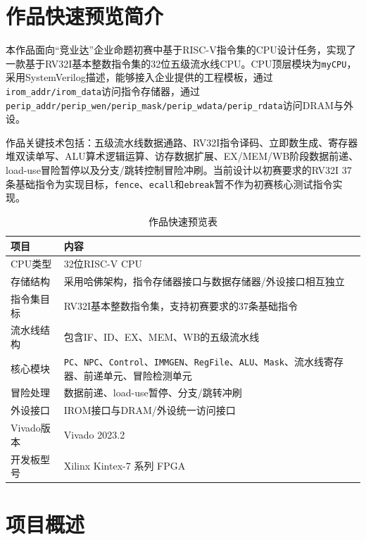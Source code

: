 \documentclass[UTF8,a4paper,12pt]{ctexart}
\newcommand{\code}[1]{\texttt{#1}}
\begin{document}
\section*{作品快速预览简介}

本作品面向``竞业达''企业命题初赛中基于RISC-V指令集的CPU设计任务，实现了一款基于RV32I基本整数指令集的32位五级流水线CPU。CPU顶层模块为\code{myCPU}，采用SystemVerilog描述，能够接入企业提供的工程模板，通过\code{irom\_addr/irom\_data}访问指令存储器，通过\code{perip\_addr/perip\_wen/perip\_mask/perip\_wdata/perip\_rdata}访问DRAM与外设。

作品关键技术包括：五级流水线数据通路、RV32I指令译码、立即数生成、寄存器堆双读单写、ALU算术逻辑运算、访存数据扩展、EX/MEM/WB阶段数据前递、load-use冒险暂停以及分支/跳转控制冒险冲刷。当前设计以初赛要求的RV32I 37条基础指令为实现目标，\code{fence}、\code{ecall}和\code{ebreak}暂不作为初赛核心测试指令实现。

\begin{table}[H]
\centering
\caption{作品快速预览表}
\begin{tabularx}{\textwidth}{p{4cm}X}
\toprule
项目 & 内容 \\
\midrule
CPU类型 & 32位RISC-V CPU \\
存储结构 & 采用哈佛架构，指令存储器接口与数据存储器/外设接口相互独立 \\
指令集目标 & RV32I基本整数指令集，支持初赛要求的37条基础指令 \\
流水线结构 & 包含IF、ID、EX、MEM、WB的五级流水线 \\
核心模块 & \code{PC}、\code{NPC}、\code{Control}、\code{IMMGEN}、\code{RegFile}、\code{ALU}、\code{Mask}、流水线寄存器、前递单元、冒险检测单元 \\
冒险处理 & 数据前递、load-use暂停、分支/跳转冲刷 \\
外设接口 & IROM接口与DRAM/外设统一访问接口 \\
Vivado版本 & Vivado 2023.2\\
开发板型号 & Xilinx Kintex-7 系列 FPGA\\

\bottomrule
\end{tabularx}
\end{table}

\newpage

\section{项目概述}
\end{document}
